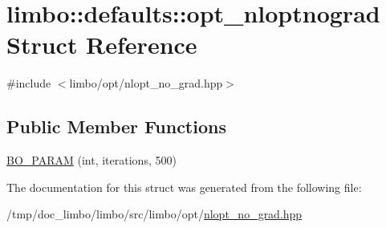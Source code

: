 \hypertarget{structlimbo_1_1defaults_1_1opt__nloptnograd}{}\section{limbo\+:\+:defaults\+:\+:opt\+\_\+nloptnograd Struct Reference}
\label{structlimbo_1_1defaults_1_1opt__nloptnograd}


{\ttfamily \#include $<$limbo/opt/nlopt\+\_\+no\+\_\+grad.\+hpp$>$}

\subsection*{Public Member Functions}
\begin{DoxyCompactItemize}
\item 
\hyperlink{group__opt__defaults_gae76755c949c322e0a8a33806c811b6f2}{B\+O\+\_\+\+P\+A\+R\+AM} (int, iterations, 500)
\end{DoxyCompactItemize}


The documentation for this struct was generated from the following file\+:\begin{DoxyCompactItemize}
\item 
/tmp/doc\+\_\+limbo/limbo/src/limbo/opt/\hyperlink{nlopt__no__grad_8hpp}{nlopt\+\_\+no\+\_\+grad.\+hpp}\end{DoxyCompactItemize}
